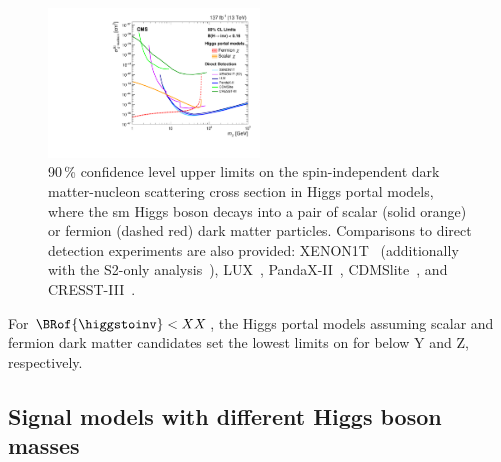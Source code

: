 \begin{figure}
    \centering
    \includegraphics[width=0.5\textwidth]{figures/dark_matter_limit/higgsPortalDM.pdf}
    \caption[90\,\% confidence level upper limits on the spin-independent dark matter-nucleon scattering cross section in Higgs portal models, where the standard model Higgs boson decays into a pair of scalar (solid orange) or fermion (dashed red) dark matter particles]{90\,\% confidence level upper limits on the spin-independent dark matter-nucleon scattering cross section in Higgs portal models, where the \acrlong{sm} Higgs boson decays into a pair of scalar (solid orange) or fermion (dashed red) dark matter particles. Comparisons to direct detection experiments are also provided: XENON1T~\cite{Aprile:2018dbl} (additionally with the S2-only analysis~\cite{Aprile:2019xxb}), LUX~\cite{Akerib:2016vxi}, PandaX-II~\cite{Cui:2017nnn}, CDMSlite~\cite{Agnese:2018gze}, and CRESST-III~\cite{Abdelhameed:2019hmk}.}
    \label{fig:higgs_portal_dm_limits}
\end{figure}

For $\BRof{\higgstoinv} < XX$, the Higgs portal models assuming scalar and fermion dark matter candidates set the lowest limits on \xsecSI for \mqdark below Y and Z\GeV, respectively.





\subsection{Signal models with different Higgs boson masses}
\label{subsec:htoinv_dark_matter_bsm_higgs}

